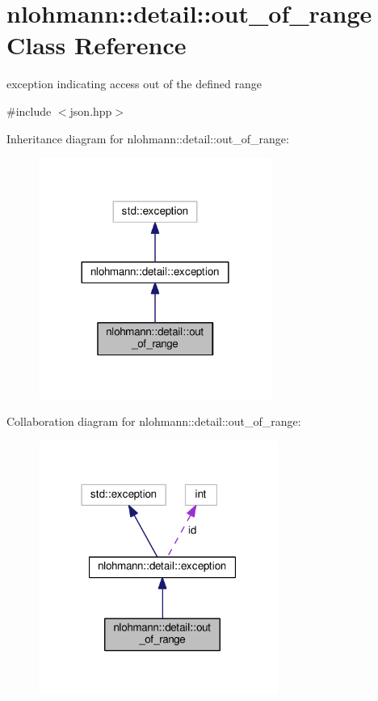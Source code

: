 \hypertarget{classnlohmann_1_1detail_1_1out__of__range}{}\section{nlohmann\+:\+:detail\+:\+:out\+\_\+of\+\_\+range Class Reference}
\label{classnlohmann_1_1detail_1_1out__of__range}


exception indicating access out of the defined range  




{\ttfamily \#include $<$json.\+hpp$>$}



Inheritance diagram for nlohmann\+:\+:detail\+:\+:out\+\_\+of\+\_\+range\+:\nopagebreak
\begin{figure}[H]
\begin{center}
\leavevmode
\includegraphics[width=216pt]{classnlohmann_1_1detail_1_1out__of__range__inherit__graph}
\end{center}
\end{figure}


Collaboration diagram for nlohmann\+:\+:detail\+:\+:out\+\_\+of\+\_\+range\+:\nopagebreak
\begin{figure}[H]
\begin{center}
\leavevmode
\includegraphics[width=223pt]{classnlohmann_1_1detail_1_1out__of__range__coll__graph}
\end{center}
\end{figure}

